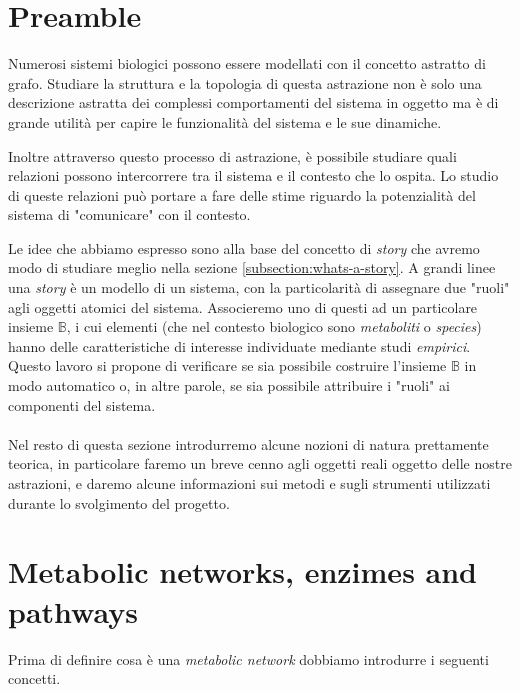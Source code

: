 
\section{Preamble}
Numerosi sistemi biologici possono essere modellati con il concetto
astratto di grafo. Studiare la struttura e la topologia di questa
astrazione non \`e solo una descrizione astratta dei complessi
comportamenti del sistema in oggetto ma \`e di grande utilit\`a per
capire le funzionalit\`a del sistema e le sue dinamiche.

Inoltre attraverso questo processo di astrazione, \`e possibile
studiare quali relazioni possono intercorrere tra il sistema e il
contesto che lo ospita. Lo studio di queste relazioni pu\`o portare a
fare delle stime riguardo la potenzialit\`a del sistema di
"comunicare" con il contesto.

Le idee che abbiamo espresso sono alla base del concetto di
\emph{story} che avremo modo di studiare meglio nella sezione
\ref{subsection:whats-a-story}. A grandi linee una \emph{story} \`e un
modello di un sistema, con la particolarit\`a di assegnare due "ruoli"
agli oggetti atomici del sistema. Associeremo uno di questi ad un
particolare insieme $\mathbb{B}$, i cui elementi (che nel contesto
biologico sono \emph{metaboliti} o \emph{species}) hanno delle
caratteristiche di interesse individuate mediante studi
\emph{empirici}.
Questo lavoro si propone di verificare se sia possibile costruire
l'insieme $\mathbb{B}$ in modo automatico o, in altre parole, se sia
possibile attribuire i "ruoli" ai componenti del sistema.
\\\\
Nel resto di questa sezione introdurremo alcune nozioni di natura
prettamente teorica, in particolare faremo un breve cenno agli oggetti
reali oggetto delle nostre astrazioni, e daremo alcune informazioni
sui metodi e sugli strumenti utilizzati durante lo svolgimento del
progetto.

\section{Metabolic networks, enzimes and pathways}

Prima di definire cosa \`e una \emph{metabolic network} dobbiamo
introdurre i seguenti concetti.

